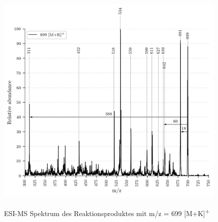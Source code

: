 \begin{figure}[!htbp]
  \centering
  \includegraphics[width=\textwidth, height=0.6\textwidth]{figures/Kapitel4/Kataboliten/VWA_MS_LeafSpray_699.png}
  \label{fig:699MKLeafspray}
  \caption[ESI-MS Spektrum des Reaktionsproduktes von Bo-DNCC, Quelle: Author]{ESI-MS Spektrum des Reaktionsproduktes mit m/z = 699 [M+K]\textsuperscript{+}}
\end{figure}

